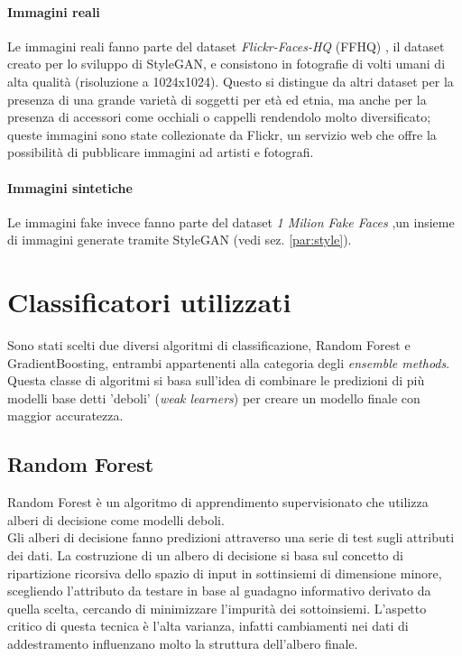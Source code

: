 \paragraph{Immagini reali}Le immagini reali fanno parte del dataset \textit{Flickr-Faces-HQ} (FFHQ) \cite{NVlabsFfhqdataset2025}, il dataset creato per lo sviluppo di StyleGAN, e consistono in fotografie di volti umani di alta qualità (risoluzione a 1024x1024). Questo si distingue da altri dataset per la presenza di una grande varietà di soggetti per età ed etnia, ma anche per la presenza di accessori come occhiali o cappelli \cite{karras2019style} rendendolo molto diversificato; queste immagini sono state collezionate da Flickr, un servizio web che offre la possibilità di pubblicare immagini ad artisti e fotografi.
\paragraph{Immagini sintetiche}Le immagini fake invece fanno parte del dataset \textit{1 Milion Fake Faces} ,un insieme di immagini generate tramite StyleGAN (vedi sez. \ref{par:style}). 
\section{Classificatori utilizzati}
Sono stati scelti due diversi algoritmi di classificazione, Random Forest e GradientBoosting, entrambi appartenenti alla categoria degli \textit{ensemble methods}. Questa classe di algoritmi si basa sull'idea di combinare le predizioni di più modelli base detti 'deboli' (\textit{weak learners}) per creare un modello finale con maggior accuratezza.
\subsection{Random Forest}
Random Forest è un algoritmo di apprendimento supervisionato che utilizza alberi di decisione come modelli deboli.\\
Gli alberi di decisione fanno predizioni attraverso una serie di test sugli attributi dei dati. La costruzione di un albero di decisione si basa sul concetto di ripartizione ricorsiva dello spazio di input in sottinsiemi di dimensione minore, scegliendo l'attributo da testare in base al guadagno informativo derivato da quella scelta, cercando di minimizzare l'impurità dei sottoinsiemi.
L'aspetto critico di questa tecnica è l'alta varianza, infatti cambiamenti nei dati di addestramento influenzano molto la struttura dell'albero finale.


